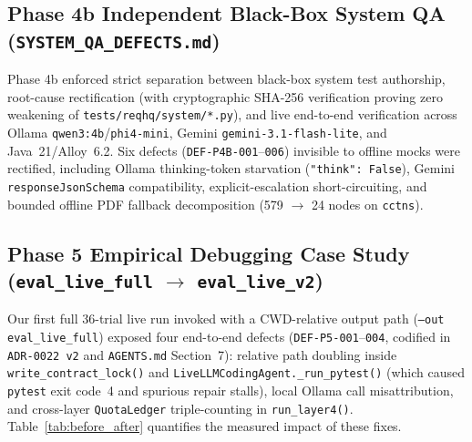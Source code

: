 \documentclass[11pt,a4paper]{article}
\begin{document}
\subsection{Phase 4b Independent Black-Box System QA (\texttt{SYSTEM\_QA\_DEFECTS.md})}
Phase 4b enforced strict separation between black-box system test authorship, root-cause rectification (with cryptographic SHA-256 verification proving zero weakening of \texttt{tests/reqhq/system/*.py}), and live end-to-end verification across Ollama \texttt{qwen3:4b}/\texttt{phi4-mini}, Gemini \texttt{gemini-3.1-flash-lite}, and Java~21/Alloy~6.2. Six defects (\texttt{DEF-P4B-001}--\texttt{006}) invisible to offline mocks were rectified, including Ollama thinking-token starvation (\texttt{"think": False}), Gemini \texttt{responseJsonSchema} compatibility, explicit-escalation short-circuiting, and bounded offline PDF fallback decomposition (579 $\rightarrow$ 24 nodes on \texttt{cctns}).

\subsection{Phase 5 Empirical Debugging Case Study (\texttt{eval\_live\_full} $\rightarrow$ \texttt{eval\_live\_v2})}
Our first full 36-trial live run invoked with a CWD-relative output path (\texttt{--out eval\_live\_full}) exposed four end-to-end defects (\texttt{DEF-P5-001}--\texttt{004}, codified in \texttt{ADR-0022 v2} and \texttt{AGENTS.md} Section~7): relative path doubling inside \texttt{write\_contract\_lock()} and \texttt{LiveLLMCodingAgent.\_run\_pytest()} (which caused \texttt{pytest} exit code~4 and spurious repair stalls), local Ollama call misattribution, and cross-layer \texttt{QuotaLedger} triple-counting in \texttt{run\_layer4()}. Table~\ref{tab:before_after} quantifies the measured impact of these fixes.
\end{document}
